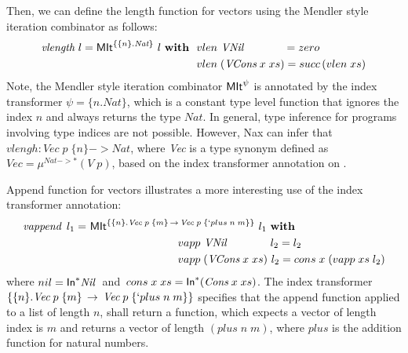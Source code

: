 Then, we can define the length function for vectors using the Mendler style
iteration combinator as follows:
\begin{align*}
\textit{vlength}~l = \textsf{MIt}^{\{\{n\} . \textit{Nat}\}}~l~\textbf{with}~~
&  vlen ~\textit{VNil}~~~~~~~~~~~ = zero \\
&  vlen \;(\textit{VCons}\;x\;xs) = succ\,(vlen\;xs)
\end{align*}
Note, the Mendler style iteration combinator $\textsf{MIt}^\psi$ is annotated by
the index transformer $\psi = \{n . \textit{Nat}\}$, which is a constant
type level function that ignores the index $n$ and always returns the 
type $\textit{Nat}$. In general, type inference for programs involving
type indices are not possible. However, Nax can infer that
$vlengh : \textit{Vec}\;p\;\{n\} -> \textit{Nat}$, where
\textit{Vec} is a type synonym defined as
$\textit{Vec} = \mu^{\textit{Nat} -> *}(V\;p)$, based on the index transformer
annotation on \MIt.

Append function for vectors illustrates a more interesting use of
the index transformer annotation:
\begin{align*}
\textit{vappend}~\,l_1 =~ &
 \textsf{MIt}^{\{\{n\} . \textit{Vec}\;p\;\{m\} \, -> \, \textit{Vec}\;p\;\{`plus\;n\;m\}\}}~l_1
 ~\textbf{with} \\
&\qquad\qquad\qquad\qquad  vapp ~\textit{VNil}~~~~~~~~~~~ ~ l_2 = l_2 \\
&\qquad\qquad\qquad\qquad  vapp \;(\textit{VCons}\;x\;xs) ~ l_2 = cons\;x\;(vapp\;xs\;l_2)
\end{align*}
where $nil = \textsf{In}^{*} \textit{Nil}\;$ and
$\,cons\;x\;xs = \textsf{In}^{*}(\textit{Cons}\;x\;xs)$.
The index transformer
$\{\{n\} . \textit{Vec}\;p\;\{m\} \, -> \, \textit{Vec}\;p\;\{`plus\;n\;m\}\}$
specifies that the append function applied to a list of length $n$,
shall return a function, which expects a vector of length index is $m$
and returns a vector of length $(plus\;n\;m)$, where $plus$ is the addition
function for natural numbers.

